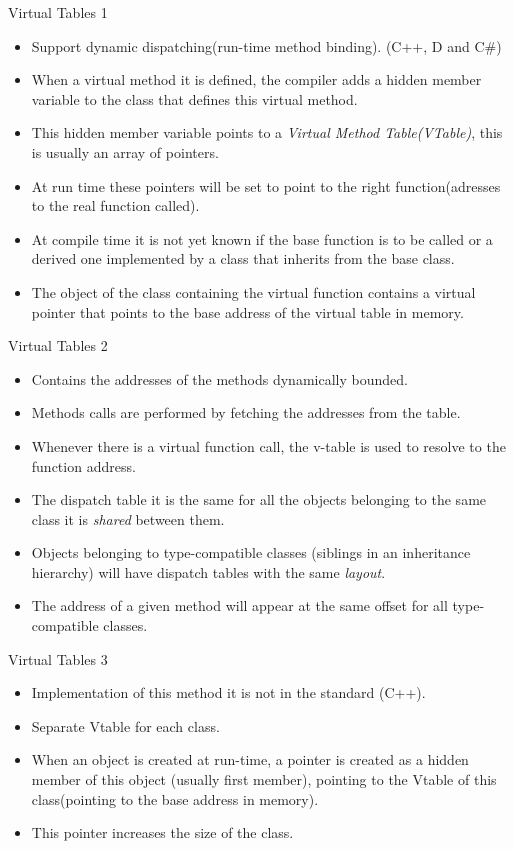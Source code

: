 \begin{frame}{Virtual Tables 1} 
    \begin{itemize}
        \item Support dynamic dispatching(run-time method binding). (C++, D and C\#)
        \item When a virtual method it is defined, the compiler adds a hidden member variable to the class that defines this virtual method.
        \item This hidden member variable points to a \emph{Virtual Method Table(VTable)}, this is usually an array of pointers.
        \item At run time these pointers will be set to point to the right function(adresses to the real function called). 
        \item At compile time it is not yet known if the base function is to be called or a derived one implemented  by a class that inherits from the base class.
        \item  The object of the class containing the virtual function contains a virtual pointer that points to the base address of the virtual table in memory.
    \end{itemize}
\end{frame}

\begin{frame}{Virtual Tables 2} 
    \begin{itemize}
        \item Contains the addresses of the methods dynamically bounded.
        \item Methods calls are performed by fetching the addresses from the table.
        \item Whenever there is a virtual function call, the v-table is used to resolve to the function address.
        \item The dispatch table it is the same for all the objects belonging to the same class it is \emph{shared} between them.
        \item Objects belonging to type-compatible classes (siblings in an inheritance hierarchy) will have dispatch tables with the same \emph{layout}.
        \item The address of a given method will appear at the same offset for all type-compatible classes.
    \end{itemize}
\end{frame}

\begin{frame}{Virtual Tables 3} 
    \begin{itemize}
        \item Implementation of this method it is not in the standard (C++). 
        \item Separate Vtable for each class.
        \item When an object is created at run-time, a pointer is created as a hidden member of this object (usually first member), 
            pointing to the Vtable of this class(pointing to the base address in memory).
        \item This pointer increases the size of the class.
    \end{itemize}
\end{frame}

